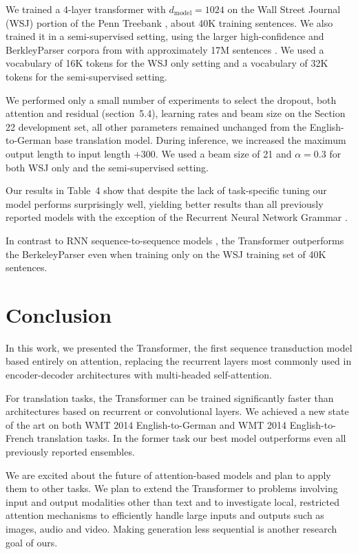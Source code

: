 We trained a 4-layer transformer with $d_{\text{model}} = 1024$ on the Wall
Street Journal (WSJ) portion of the Penn Treebank \cite{marcus1993building},
about 40K training sentences. We also trained it in a semi-supervised setting,
using the larger high-confidence and BerkleyParser corpora from with approximately
17M sentences \cite{vinyals2015grammar,zhu2013fast}. We used a vocabulary of
16K tokens for the WSJ only setting and a vocabulary of 32K tokens for the
semi-supervised setting.

We performed only a small number of experiments to select the dropout, both
attention and residual (section~5.4), learning rates and beam size on the
Section 22 development set, all other parameters remained unchanged from the
English-to-German base translation model. During inference, we increased the
maximum output length to input length $+ 300$. We used a beam size of 21 and
$\alpha = 0.3$ for both WSJ only and the semi-supervised setting.

Our results in Table~4 show that despite the lack of task-specific tuning our
model performs surprisingly well, yielding better results than all previously
reported models with the exception of the Recurrent Neural Network Grammar
\cite{dyer2016recurrent}.

In contrast to RNN sequence-to-sequence models \cite{vinyals2015grammar}, the
Transformer outperforms the BerkeleyParser \cite{petrov2006learning} even when
training only on the WSJ training set of 40K sentences.

\section{Conclusion}

In this work, we presented the Transformer, the first sequence transduction model
based entirely on attention, replacing the recurrent layers most commonly used in
encoder-decoder architectures with multi-headed self-attention.

For translation tasks, the Transformer can be trained significantly faster than
architectures based on recurrent or convolutional layers. We achieved a new state
of the art on both WMT 2014 English-to-German and WMT 2014 English-to-French
translation tasks. In the former task our best model outperforms even all
previously reported ensembles.

We are excited about the future of attention-based models and plan to apply them
to other tasks. We plan to extend the Transformer to problems involving input and
output modalities other than text and to investigate local, restricted attention
mechanisms to efficiently handle large inputs and outputs such as images, audio
and video. Making generation less sequential is another research goal of ours.

